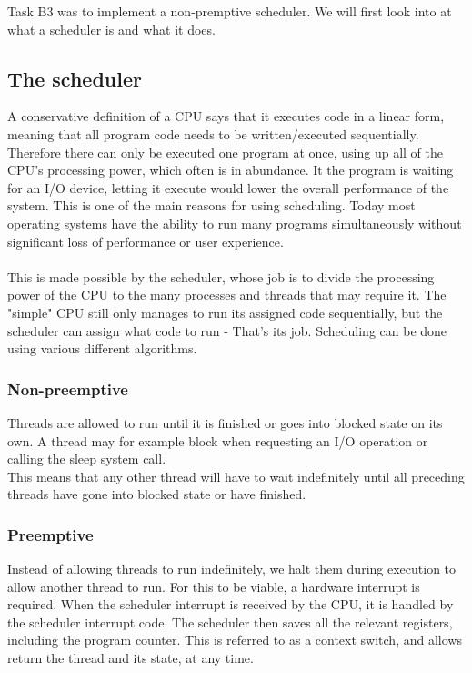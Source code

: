 Task B3 was to implement a non-premptive scheduler. We will first look into at what a scheduler is and what it does.

\subsection{The scheduler}
A conservative definition of a CPU says that it executes code in a linear form, meaning that all program code needs to be written/executed sequentially. Therefore there can only be executed one program at once, using up all of the CPU's processing power, which often is in abundance. It the program is waiting for an I/O device, letting it execute would lower the overall performance of the system. This is one of the main reasons for using scheduling. Today most operating systems have the ability to run many programs simultaneously without significant loss of performance or user experience.\\
\\
This is made possible by the scheduler, whose job is to divide the processing power of the CPU to the many processes and threads that may require it. The "simple" CPU still only manages to run its assigned code sequentially, but the scheduler can assign what code to run - That's its job. Scheduling can be done using various different algorithms.

\subsubsection{Non-preemptive}
Threads are allowed to run until it is finished or goes into blocked state on its own. A thread may for example block when requesting an I/O operation or calling the sleep system call.
\\
This means that any other thread will have to wait indefinitely until all preceding threads have gone into blocked state or have finished. 

\subsubsection{Preemptive}
Instead of allowing threads to run indefinitely, we halt them during execution to allow another thread to run. For this to be viable, a hardware interrupt is required. When the scheduler interrupt is received by the CPU, it is handled by the scheduler interrupt code. The scheduler then saves all the relevant registers, including the program counter. This is referred to as a context switch, and allows return the thread and its state, at any time.

